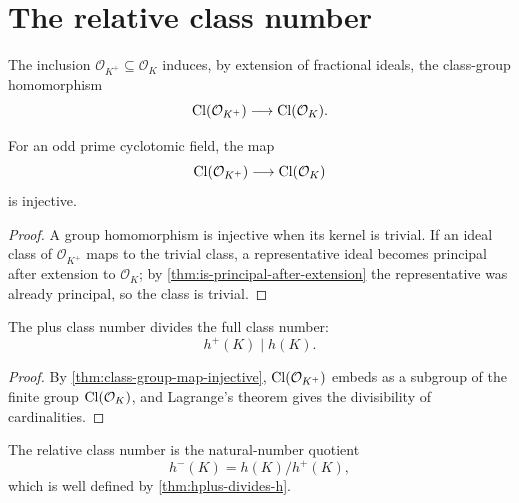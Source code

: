 \section{The relative class number}

\begin{definition}\label{def:class-group-map}
  \leanok
The inclusion $\mathcal O_{K^+}\subseteq\mathcal O_K$ induces, by extension
of fractional ideals, the class-group homomorphism
\[
  \mathrm{Cl}(\mathcal O_{K^+})\longrightarrow \mathrm{Cl}(\mathcal O_K).
\]
\end{definition}

\begin{theorem}\label{thm:class-group-map-injective}
  \leanok
For an odd prime cyclotomic field, the map
\[
  \mathrm{Cl}(\mathcal O_{K^+})\longrightarrow \mathrm{Cl}(\mathcal O_K)
\]
is injective.
\end{theorem}
\begin{proof}\leanok
A group homomorphism is injective when its kernel is trivial.  If an ideal
class of $\mathcal O_{K^+}$ maps to the trivial class, a representative
ideal becomes principal after extension to $\mathcal O_K$; by
\cref{thm:is-principal-after-extension} the representative was already
principal, so the class is trivial.
\end{proof}

\begin{theorem}\label{thm:hplus-divides-h}
  \leanok
The plus class number divides the full class number:
\[
  h^+(K)\mid h(K).
\]
\end{theorem}
\begin{proof}\leanok
By \cref{thm:class-group-map-injective}, $\mathrm{Cl}(\mathcal O_{K^+})$ embeds as
a subgroup of the finite group $\mathrm{Cl}(\mathcal O_K)$, and Lagrange's theorem
gives the divisibility of cardinalities.
\end{proof}

\begin{definition}\label{def:class-number-hminus}
  \leanok
The relative class number is the natural-number quotient
\[
  h^-(K)=h(K)/h^+(K),
\]
which is well defined by \cref{thm:hplus-divides-h}.
\end{definition}

